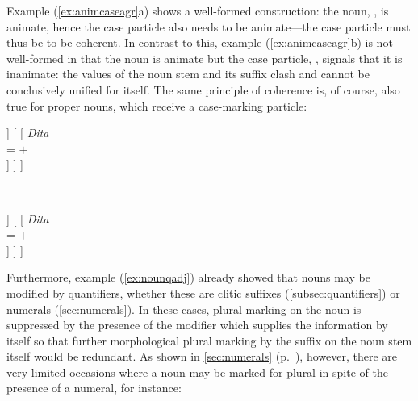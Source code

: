 Example (\ref{ex:animcaseagr}a) shows a well-formed construction: the noun,
, is animate, hence the case particle also needs to be 
animate---the case particle must thus be  to be coherent. In
contrast to this, example (\ref{ex:animcaseagr}b) is not well-formed in that
the noun is animate but the case particle, , signals that it
is inanimate: the \Anim{} values of the noun stem and its suffix clash and
cannot be conclusively unified for  itself. The same principle of
coherence is, of course, also true for proper nouns, which receive a
case-marking particle:

\ex\label{ex:animcaseagrname}
\begin{minipage}[t]{.5\remaining}
\tl\quad\label{ex:animokname} %
\begin{forest}
[\anno{\xhead{N}}
	[\anno{Cl}
		[{%
			\textit{ang} \\
			\ups{\Anim} = $+$ \\
			\ups{\Case} = \Aarg{} \\
		}]
	]
	[
		[{%
			\textit{Dita} \\
			\ups{\Anim} = $+$ \\
		}]
	]
]
\end{forest}
\end{minipage}
~
\begin{minipage}[t]{.5\remaining}
\tl\quad\label{ex:animclashname} %
\ljudge*\begin{forest}
[\anno{\xhead{N}}
	[\anno{Cl}
		[{%
			\textit{eng} \\
			\ups{\Anim} = $-$ \\
			\ups{\Case} = \Aarg{} \\
		}]
	]
	[
		[{%
			\textit{Dita} \\
			\ups{\Anim} = $+$ \\
		}]
	]
]
\end{forest}
\end{minipage}
\xe

Furthermore, example (\ref{ex:nounqadj}) already showed that nouns may be
modified by quantifiers, whether these are clitic suffixes
(\autoref{subsec:quantifiers}) or numerals (\autoref{sec:numerals}). In these
cases, plural marking on the noun is suppressed by the presence of the modifier
which supplies the information by itself so that further morphological plural
marking by the suffix  on the noun stem itself would be
redundant. As shown in \autoref{sec:numerals} (p.~\pageref{hundreds}), however,
there are very limited occasions where a noun may be marked for plural in spite
of the presence of a numeral, for instance:

